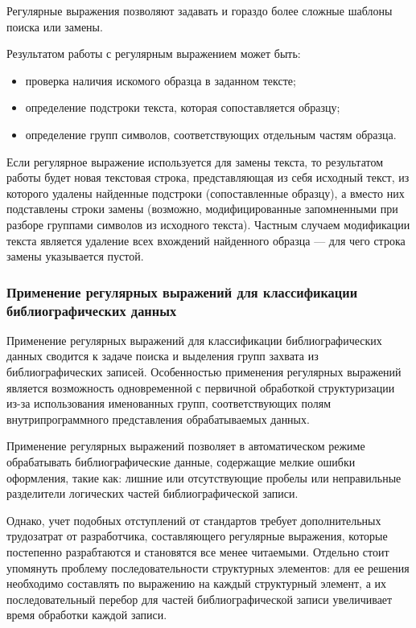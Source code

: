 Регулярные выражения позволяют задавать и гораздо более сложные шаблоны поиска или замены.

Результатом работы с регулярным выражением может быть:
\begin{itemize}
    \item проверка наличия искомого образца в заданном тексте;
	\item определение подстроки текста, которая сопоставляется образцу;
	\item определение групп символов, соответствующих отдельным частям образца.
\end{itemize}

Если регулярное выражение используется для замены текста, то результатом работы будет новая текстовая строка, представляющая из себя исходный текст, из которого удалены найденные подстроки (сопоставленные образцу), а вместо них подставлены строки замены (возможно, модифицированные запомненными при разборе группами символов из исходного текста). Частным случаем модификации текста является удаление всех вхождений найденного образца — для чего строка замены указывается пустой.

\subsubsection*{Применение регулярных выражений для классификации библиографических данных}
Применение регулярных выражений для классификации библиографических данных сводится к задаче поиска и выделения групп захвата из библиографических записей. Особенностью применения регулярных выражений является возможность одновременной с первичной обработкой структуризации из-за использования именованных групп, соответствующих полям внутрипрограммного представления обрабатываемых данных.

Применение регулярных выражений позволяет в автоматическом режиме обрабатывать библиографические данные, содержащие мелкие ошибки оформления, такие как: лишние или отсутствующие пробелы или неправильные разделители логических частей библиографической записи.

Однако, учет подобных отступлений от стандартов требует дополнительных трудозатрат от разработчика, составляющего регулярные выражения, которые постепенно разрабтаются и становятся все менее читаемыми. Отдельно стоит упомянуть проблему последовательности структурных элементов: для ее решения необходимо составлять по выражению на каждый структурный элемент, а их последовательный перебор для частей библиографической записи увеличивает время обработки каждой записи.

